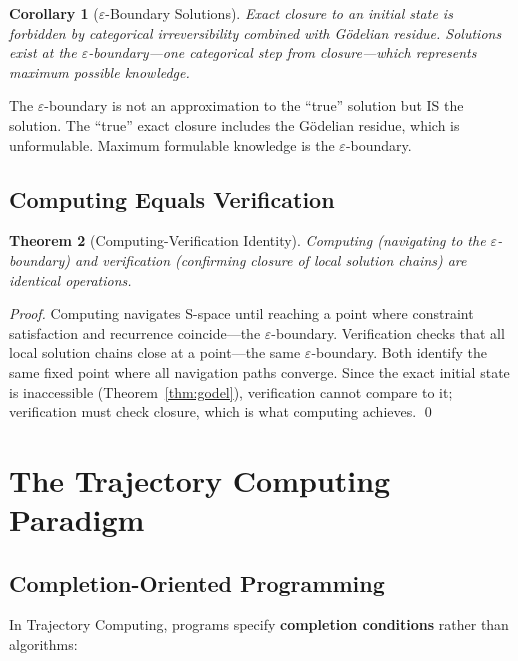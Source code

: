 \documentclass[twocolumn,10pt]{article}
\newtheorem{theorem}{Theorem}[section]
\newtheorem{corollary}[theorem]{Corollary}
\theoremstyle{remark}
\newcommand{\eps}{\varepsilon}
\begin{document}
\begin{corollary}[$\eps$-Boundary Solutions]
\label{cor:epsilon}
Exact closure to an initial state is forbidden by categorical irreversibility combined with Gödelian residue. Solutions exist at the $\eps$-boundary---one categorical step from closure---which represents maximum possible knowledge.
\end{corollary}

The $\eps$-boundary is not an approximation to the ``true'' solution but IS the solution. The ``true'' exact closure includes the Gödelian residue, which is unformulable. Maximum formulable knowledge is the $\eps$-boundary.

\subsection{Computing Equals Verification}

\begin{theorem}[Computing-Verification Identity]
\label{thm:compute_verify}
Computing (navigating to the $\eps$-boundary) and verification (confirming closure of local solution chains) are identical operations.
\end{theorem}

\begin{proof}
Computing navigates S-space until reaching a point where constraint satisfaction and recurrence coincide---the $\eps$-boundary. Verification checks that all local solution chains close at a point---the same $\eps$-boundary. Both identify the same fixed point where all navigation paths converge. Since the exact initial state is inaccessible (Theorem~\ref{thm:godel}), verification cannot compare to it; verification must check closure, which is what computing achieves. \qed
\end{proof}

\section{The Trajectory Computing Paradigm}
\label{sec:paradigm}

\subsection{Completion-Oriented Programming}

In Trajectory Computing, programs specify \textbf{completion conditions} rather than algorithms:
\end{document}
